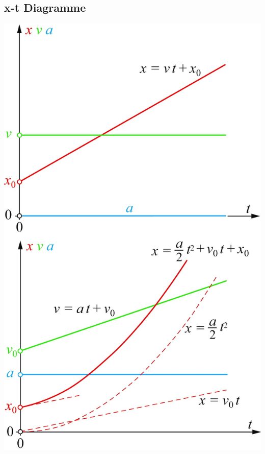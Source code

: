 \documentclass[a4paper]{scrartcl}
\begin{document}
	\begin{multicols}{2}
		\subsection{x-t Diagramme}
		\includegraphics[width=0.9\linewidth]{img/kinematik1}
		

\end{multicols}
\end{document}
